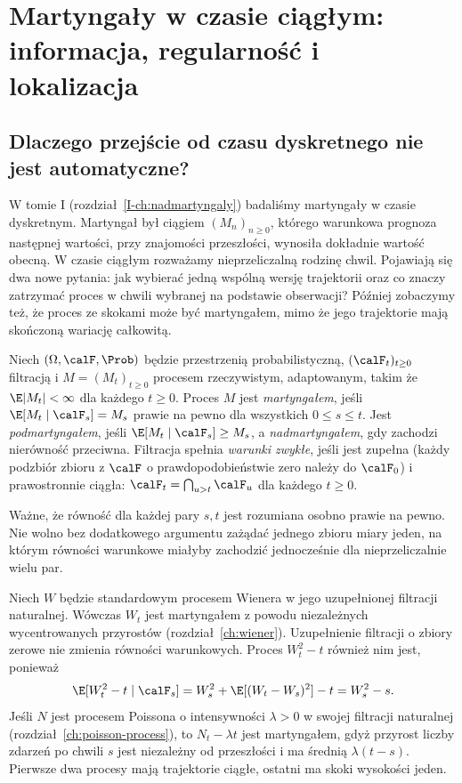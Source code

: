 \chapter{Martyngały w czasie ciągłym: informacja, regularność i lokalizacja}
\label{ch:mart-cont}

\section{Dlaczego przejście od czasu dyskretnego nie jest automatyczne?}
W tomie I (rozdział~\ref{I-ch:nadmartyngaly})
badaliśmy martyngały w czasie dyskretnym.
Martyngał był ciągiem $(M_n)_{n\ge0}$, którego
warunkowa prognoza następnej wartości, przy znajomości przeszłości,
wynosiła dokładnie wartość obecną. W czasie ciągłym rozważamy
nieprzeliczalną rodzinę chwil. Pojawiają się dwa nowe pytania:
jak wybierać jedną wspólną wersję trajektorii oraz co znaczy
zatrzymać proces w chwili wybranej na podstawie obserwacji?
Później zobaczymy też, że proces ze skokami może być martyngałem,
mimo że jego trajektorie mają skończoną wariację całkowitą.

\begin{definicja}
Niech $(\Omega,\calF,\Prob)$ będzie przestrzenią probabilistyczną,
$(\calF_t)_{t\ge0}$ filtracją i $M=(M_t)_{t\ge0}$ procesem
rzeczywistym, adaptowanym, takim że $\E|M_t|<\infty$
dla każdego $t\ge0$. Proces $M$ jest \emph{martyngałem}, jeśli
$\E[M_t\mid\calF_s]=M_s$ prawie na pewno dla wszystkich
$0\le s\le t$. Jest \emph{podmartyngałem}, jeśli
$\E[M_t\mid\calF_s]\ge M_s$, a \emph{nadmartyngałem},
gdy zachodzi nierówność przeciwna. Filtracja spełnia
\emph{warunki zwykłe}, jeśli jest zupełna (każdy podzbiór zbioru z $\calF$ o prawdopodobieństwie
zero należy do $\calF_0$) i prawostronnie ciągła:
$\calF_t=\bigcap_{u>t}\calF_u$ dla każdego $t\ge0$.
\end{definicja}

Ważne, że równość dla każdej pary $s,t$ jest rozumiana osobno
prawie na pewno. Nie wolno bez dodatkowego argumentu zażądać
jednego zbioru miary jeden, na którym równości warunkowe
miałyby zachodzić jednocześnie dla nieprzeliczalnie wielu par.

\begin{przyklad}
Niech $W$ będzie standardowym procesem Wienera w jego
uzupełnionej filtracji naturalnej. Wówczas
$W_t$ jest martyngałem z powodu niezależnych wycentrowanych
przyrostów (rozdział~\ref{ch:wiener}). Uzupełnienie filtracji
o zbiory zerowe nie zmienia równości warunkowych. Proces $W_t^2-t$ również nim jest, ponieważ
\[
\E[W_t^2-t\mid\calF_s]
=W_s^2+\E[(W_t-W_s)^2]-t=W_s^2-s.
\]
Jeśli $N$ jest procesem Poissona o intensywności $\lambda>0$
w swojej filtracji naturalnej (rozdział~\ref{ch:poisson-process}),
to $N_t-\lambda t$ jest martyngałem, gdyż przyrost liczby
zdarzeń po chwili $s$ jest niezależny od przeszłości i ma
średnią $\lambda(t-s)$. Pierwsze dwa procesy mają trajektorie
ciągłe, ostatni ma skoki wysokości jeden.
\end{przyklad}

